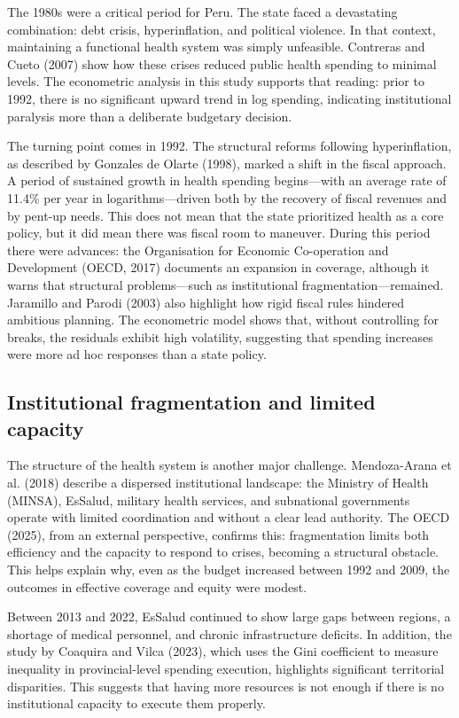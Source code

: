 \documentclass[12pt]{article}
\begin{document}
The 1980s were a critical period for Peru. The state faced a devastating combination: debt crisis, hyperinflation, and political violence. In that context, maintaining a functional health system was simply unfeasible. Contreras and Cueto (2007) show how these crises reduced public health spending to minimal levels. The econometric analysis in this study supports that reading: prior to 1992, there is no significant upward trend in log spending, indicating institutional paralysis more than a deliberate budgetary decision.

The turning point comes in 1992. The structural reforms following hyperinflation, as described by Gonzales de Olarte (1998), marked a shift in the fiscal approach. A period of sustained growth in health spending begins—with an average rate of 11.4\% per year in logarithms—driven both by the recovery of fiscal revenues and by pent-up needs. This does not mean that the state prioritized health as a core policy, but it did mean there was fiscal room to maneuver. During this period there were advances: the Organisation for Economic Co-operation and Development (OECD, 2017) documents an expansion in coverage, although it warns that structural problems—such as institutional fragmentation—remained. Jaramillo and Parodi (2003) also highlight how rigid fiscal rules hindered ambitious planning. The econometric model shows that, without controlling for breaks, the residuals exhibit high volatility, suggesting that spending increases were more ad hoc responses than a state policy.

\subsection{Institutional fragmentation and limited capacity}

The structure of the health system is another major challenge. Mendoza-Arana et al. (2018) describe a dispersed institutional landscape: the Ministry of Health (MINSA), EsSalud, military health services, and subnational governments operate with limited coordination and without a clear lead authority. The OECD (2025), from an external perspective, confirms this: fragmentation limits both efficiency and the capacity to respond to crises, becoming a structural obstacle. This helps explain why, even as the budget increased between 1992 and 2009, the outcomes in effective coverage and equity were modest.

Between 2013 and 2022, EsSalud continued to show large gaps between regions, a shortage of medical personnel, and chronic infrastructure deficits. In addition, the study by Coaquira and Vilca (2023), which uses the Gini coefficient to measure inequality in provincial-level spending execution, highlights significant territorial disparities. This suggests that having more resources is not enough if there is no institutional capacity to execute them properly.
\end{document}
